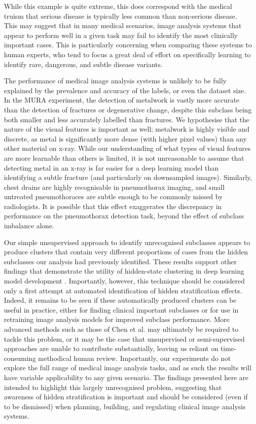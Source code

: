 \documentclass{article}
\begin{document}
While this example is quite extreme, this does correspond with the medical truism that serious disease is typically less common than non-serious disease. 
This may suggest that in many medical scenarios, image analysis systems that appear to perform well in a given task may fail to identify the most clinically important cases. 
This is particularly concerning when comparing these systems to human experts, who tend to focus a great deal of effort on specifically learning to identify rare, dangerous, and subtle disease variants.

The performance of medical image analysis systems is unlikely to be fully explained by the prevalence and accuracy of the labels, or even the dataset size. 
In the MURA experiment, the detection of metalwork is vastly more accurate than the detection of fractures or degenerative change, despite this subclass being both smaller and less accurately labelled than fractures. 
We hypothesise that the nature of the visual features is important as well; metalwork is highly visible and discrete, as metal is significantly more dense (with higher pixel values) than any other material on x-ray. 
While our understanding of what types of visual features are more learnable than others is limited, it is not unreasonable to assume that detecting metal in an x-ray is far easier for a deep learning model than identifying a subtle fracture (and particularly on downsampled images).
Similarly, chest drains are highly recognisable in pneumothorax imaging, and small untreated pneumothoraces are subtle enough to be commonly missed by radiologists. 
It is possible that this effect exaggerates the discrepancy in performance on the pneumothorax detection task, beyond the effect of subclass imbalance alone.

Our simple unsupervised approach to identify unrecognised subclasses appears to produce clusters that contain very different proportions of cases from the hidden subclasses our analysis had previously identified. 
These results support other findings that demonstrate the utility of hidden-state clustering in deep learning model development \citep{Liu2019-qt}.
Importantly, however, this technique should be considered only a first attempt at automated identification of hidden stratification effects. 
Indeed, it remains to be seen if these automatically produced clusters can be useful in practice, either for finding clinical important subclasses or for use in retraining image analysis models for improved subclass performance. 
More advanced methods such as those of Chen et al. \citep{chen2019slicing} may ultimately be required to tackle this problem, or it may be the case that unsupervised or semi-supervised approaches are unable to contribute substantially, leaving us reliant on time-consuming methodical human review.
Importantly, our experiments do not explore the full range of medical image analysis tasks, and as such the results will have variable applicability to any given scenario.
The findings presented here are intended to highlight this largely unrecognised problem, suggesting that awareness of hidden stratification is important and should be considered (even if to be dismissed) when planning, building, and regulating clinical image analysis systems.
 
\end{document}
